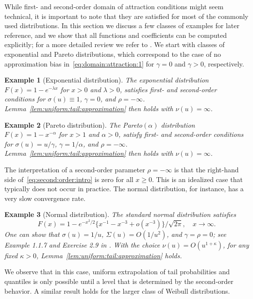 \documentclass{statsoc}
\newtheorem{example}{Example}
\theoremstyle{break}
\begin{document}
While first- and second-order domain of attraction conditions might seem technical, it is important to note that they are satisfied for most of
the commonly used distributions. In this section we discuss a few classes of examples for later reference, 
and we show that all functions and coefficients can be computed explicitly; for a more detailed review we refer to \cite{fraga:gomes:dehaan:neves:2007}.
We start with classes of exponential and Pareto distributions, which correspond to the case of no approximation bias in~\eqref{eq:domain:attraction:1} 
for $\gamma =0$ and $\gamma >0$, respectively.





\begin{example}[Exponential distribution]\label{ex:exponential:distribution}
	The exponential distribution $F(x)  = 1 - e^{-\lambda x}$ for $x >0$ and $\lambda > 0$, satisfies first- and second-order conditions for $\sigma(u) \equiv 1$, $\gamma = 0$, and $\rho = - \infty$. Lemma~\ref{lem:uniform:tail:approximation} then holds with $\nu(u) = \infty$.
\end{example}

\begin{example}[Pareto distribution]
	The Pareto$(\alpha)$ distribution $F(x) = 1 - x^{-\alpha}$ for $x > 1$ and $\alpha > 0$, satisfy first- and second-order conditions for $\sigma(u) = u/\gamma $, $\gamma = 1/\alpha$, and $\rho = - \infty$.
	Lemma~\ref{lem:uniform:tail:approximation} then holds with $\nu(u) = \infty$.
\end{example}

The interpretation of a second-order parameter $\rho = -\infty$ is that the
right-hand side of~\eqref{eq:second:order:intro} is zero for all $x\geq  0$.
This is an idealized case that typically does not occur in practice. The normal distribution, for instance, has a very slow convergence rate. 

\begin{example}[Normal distribution]
	The standard normal distribution satisfies 
	\[F(x) = 1 - e^{-x^2/2}\{x^{-1} - x^{-3} + o(x^{-3})\}/\sqrt{2\pi }, \quad x\to \infty.\] 
	One can show that 
	$\sigma(u) = 1/u$, $\Sigma(u) = O(1/u^2)$, 
	and $\gamma = \rho = 0$;
	 see Example 1.1.7 and Exercise 2.9 in \citet{dehaan:ferreira:2006}. 
	With the choice $\nu(u) = O(u^{1+\kappa})$, 
	for any fixed  $\kappa > 0$, Lemma~\ref{lem:uniform:tail:approximation} holds. 
\end{example}
We observe that in this case, uniform extrapolation of tail probabilities and quantiles is only possible until a level that is determined by the second-order behavior. A similar result holds for the larger class of Weibull distributions.
\end{document}
